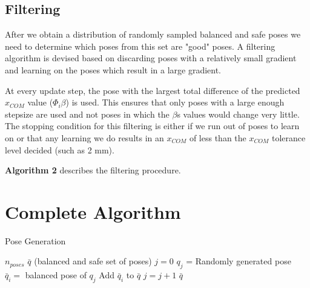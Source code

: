 \documentclass[letterpaper, 10pt, conference]{ieeeconf}
\begin{document}
\subsection{Filtering}
After we obtain a distribution of randomly sampled balanced and safe poses we
need to determine which poses from this set are "good" poses. A filtering
algorithm is devised based on discarding poses with a relatively small gradient and
learning on the poses which result in a large gradient.

At every update step, the pose with the largest total difference of the predicted
$x_{COM}$ value ($\Phi_i \beta$) is used. This ensures that only poses with a
large enough stepsize are used and not poses in which the $\beta$s values would
change very little. The stopping condition for this filtering is either if we
run out of poses to learn on or that any learning we do results in an $x_{COM}$
of less than the $x_{COM}$ tolerance level decided (such as 2 mm).

\textbf{Algorithm 2} describes the filtering procedure.

\section{Complete Algorithm}


\begin{algorithm}
    \caption{Pose Generation}
    \begin{algorithmic}[1]
        \renewcommand{\algorithmicrequire}{\textbf{Input:}}
        \renewcommand{\algorithmicensure}{\textbf{Output:}}
        \REQUIRE $n_{poses}$
        \ENSURE  $\bar{q} $ (balanced and safe set of poses)
        \STATE $j = 0$
        \STATE $q_j $ = Randomly generated pose
        \STATE $\bar{q}_i =$ balanced pose of $q_j$
        \STATE Add $\bar{q}_i $ to $\bar{q}$
        \ENDIF
        \STATE $ j = j + 1 $
        \ENDWHILE
        \RETURN $\bar{q}$
    \end{algorithmic}
\end{algorithm}
\end{document}
